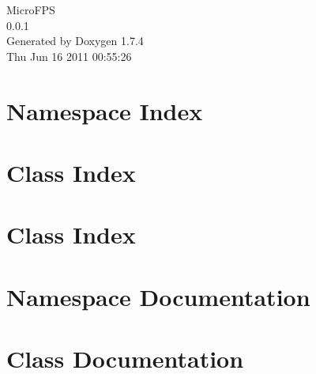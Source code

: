 \documentclass[a4paper]{book}
\begin{document}
\hypersetup{pageanchor=false}
\begin{titlepage}
\vspace*{7cm}
\begin{center}
{\Large MicroFPS \\[1ex]\large 0.0.1 }\\
\vspace*{1cm}
{\large Generated by Doxygen 1.7.4}\\
\vspace*{0.5cm}
{\small Thu Jun 16 2011 00:55:26}\\
\end{center}
\end{titlepage}
\clearemptydoublepage
{}
\tableofcontents
\clearemptydoublepage
{}
\hypersetup{pageanchor=true}
\chapter{Namespace Index}

\chapter{Class Index}

\chapter{Class Index}

\chapter{Namespace Documentation}

\chapter{Class Documentation}













\printindex
\end{document}
